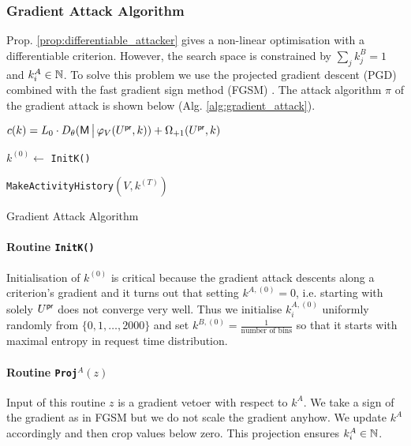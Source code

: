\subsubsection{Gradient Attack Algorithm}\label{sec:gradient_attack_algorithm}
Prop. \ref{prop:differentiable_attacker} gives a non-linear optimisation with a differentiable criterion. However, the search space is constrained by $\sum_j k_j^B = 1 $ and $k_i^A \in \mathbb{N}$. To solve this problem we use the projected gradient descent (PGD) \cite{pgd} combined with the fast gradient sign method (FGSM) \cite{adversarial_examples}. The attack algorithm $\pi$ of the gradient attack is shown below (Alg. \ref{alg:gradient_attack}).

\begin{algorithm}[H]
    \SetAlgoLined
    $c(k) = L_0 \cdot D_\theta(\mathsf{M} \,\big|\, \varphi_V(U^{\mathsf{pr}}, k)) + \Omega_{{\text{+}1}}(U^{\mathsf{pr}}, k)$\;

    $k^{(0)} \gets $ \texttt{InitK()}\;

    \Return \texttt{MakeActivityHistory}$(V, k^{(T)})$

    \caption{Gradient Attack Algorithm}\label{alg:gradient_attack}
\end{algorithm}

\paragraph{Routine \texttt{InitK()}}
Initialisation of $k^{(0)}$ is critical because the gradient attack descents along a criterion's gradient and it turns out that setting $k^{A, (0)} = 0$, i.e. starting with solely $U^{\mathsf{pr}}$ does not converge very well. Thus we initialise $k^{A, (0)}_i$ uniformly randomly from $\{0, 1, \dots, 2000 \}$ and set $k^{B, (0)} = \frac{1}{\text{number of bins}}$ so that it starts with maximal entropy in request time distribution.

\paragraph{Routine \texttt{Proj}$^A (z)$}
Input of this routine $z$ is a gradient vetoer with respect to $k^{A}$. We take a sign of the gradient as in FGSM but we do not scale the gradient anyhow. We update $k^{A}$ accordingly and then crop values below zero. This projection ensures $k_i^{A} \in \mathbb{N}$.

